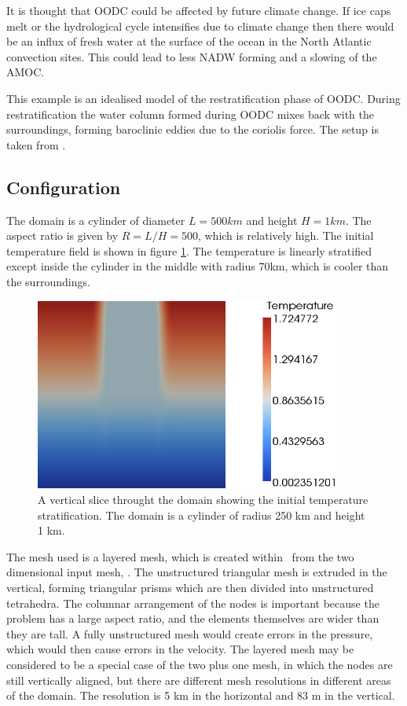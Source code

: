 It is thought that OODC could be affected by future climate change. If ice caps melt or the hydrological cycle intensifies due to climate change then there would be an influx of fresh water at the surface of the ocean in the North Atlantic convection sites. This could lead to less NADW forming and a slowing of the AMOC.  

This example is an idealised model of the restratification phase of OODC. During restratification the water column formed during OODC mixes back with the surroundings, forming baroclinic eddies due to the coriolis force. The setup is taken from  \cite{rousset09}. 

\subsection{Configuration}

The domain is a cylinder of diameter $L=500\unit{km}$ and height $H=1\unit{km}$. The aspect ratio is given by $R=L/H=500$, which is relatively high.  The initial temperature field is shown in figure \ref{fig:rousset-init}. The temperature is linearly stratified except inside the cylinder in the middle with radius 70km, which is cooler than the surroundings. 

\begin{figure}[h]
\begin{center}
\includegraphics[width=10cm]{examples_images/restratification_after_oodc/rousset-init.png}
\caption{A vertical slice throught the domain showing the initial temperature stratification. The domain is a cylinder of radius 250 km and height 1 km. }
\label{fig:rousset-init}
\end{center}
\end{figure}


The mesh used is a layered mesh, which is created within \fluidity\ from the two dimensional input mesh, . The unstructured triangular mesh is extruded in the vertical, forming triangular prisms which are then divided into unstructured tetrahedra. The columnar arrangement of the nodes is important because the problem has a large aspect ratio, and the elements themselves are wider than they are tall. A fully unstructured mesh would create errors in the pressure, which would then cause errors in the velocity. The layered mesh may be considered to be a special case of the two plus one mesh, in which the nodes are still vertically aligned, but there are different mesh resolutions in different areas of the domain. The resolution is 5 km in the horizontal and 83 m in the vertical. 


